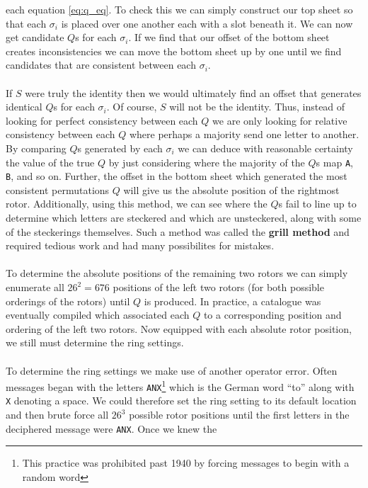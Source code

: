 each equation \ref{eq:q_eq}. To check this we can simply construct
our top sheet so that each $\sigma_i$ is placed over one another each
with a slot beneath it. We can now get candidate $Q$s for each
$\sigma_i$. If we find that our offset of the bottom sheet creates
inconsistencies we can move the bottom sheet up by one until we find
candidates that are consistent between each $\sigma_i$.
\\\\If $S$ were truly the identity then we would ultimately find an
offset that generates identical $Q$s for each $\sigma_i$. Of course,
$S$ will not be the identity. Thus, instead of looking for perfect
consistency between each $Q$ we are only looking for relative
consistency between each $Q$ where perhaps a majority send one letter
to another. By comparing $Q$s generated by each $\sigma_i$ we can
deduce with reasonable certainty the value of the true $Q$ by just
considering where the majority of the $Q$s map \texttt{A},
\texttt{B}, and so on. Further, the offset in the bottom sheet which
generated the most consistent permutations $Q$ will give us the
absolute position of the rightmost rotor. Additionally, using this
method, we can see where the $Q$s fail to line up to determine which
letters are steckered and which are unsteckered, along with some of
the steckerings themselves. Such a method was called the {\bf{grill
			method}} and required tedious work and had many possibilites for mistakes.
\\\\To determine the absolute positions of the remaining two rotors
we can simply enumerate all $26^2 = 676$ positions of the left two
rotors (for both possible orderings of the rotors) until $Q$ is
produced. In practice, a catalogue was eventually compiled which
associated each $Q$ to a corresponding position and ordering of the
left two rotors. Now equipped with each absolute rotor position, we
still must determine the ring settings.
\\\\To determine the ring settings we make use of another operator
error. Often messages began with the letters \texttt{ANX}\footnote{This practice was prohibited past 1940 by forcing messages to begin with a random word} which is
the German word ``to'' along with \texttt{X} denoting a space. We
could therefore set the ring setting to its default location and then
brute force all $26^3$ possible rotor positions until the first
letters in the deciphered message were \texttt{ANX}. Once we knew the
